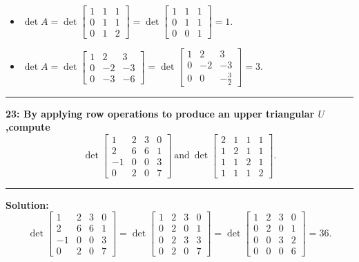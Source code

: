 \documentclass[11pt]{article}
\newcommand\question[2]{\vspace{.25in}\hrule\textbf{#1: #2}\vspace{.5em}\hrule\vspace{.10in}}
\newcommand\solution{\vspace{.10in}\textbf{Solution: }}
\begin{document}
\begin{itemize}
\item $\det A=\det
  \begin{bmatrix}
    1&1&1\\
   0&1&1\\
0&1&2
  \end{bmatrix}=\det
  \begin{bmatrix}
    1&1&1\\
    0&1&1\\
    0&0&1
  \end{bmatrix}=1.
$
\item $\det A=\det
  \begin{bmatrix}
    1&2&3\\
0&-2&-3\\
0&-3&-6
  \end{bmatrix}=\det
  \begin{bmatrix}
    1&2&3\\
    0&-2&-3\\
    0&0&-\frac{3}{2}
  \end{bmatrix}=3.
$
\end{itemize}
\question{23}{By applying row operations to produce an upper
  triangular $U$,compute
$$
\det
\begin{bmatrix}
  1&2&3&0\\
2&6&6&1\\
-1&0&0&3\\
0&2&0&7
\end{bmatrix}~\mbox{and}~\det
\begin{bmatrix}
  2&1&1&1\\
1&2&1&1\\
1&1&2&1\\
1&1&1&2
\end{bmatrix}.
$$
}
\solution 
$$
\det
\begin{bmatrix}
  1&2&3&0\\
  2&6&6&1\\
  -1&0&0&3\\
  0&2&0&7
\end{bmatrix}=\det
\begin{bmatrix}
  1&2&3&0\\
  0&2&0&1\\
  0&2&3&3\\
  0&2&0&7
\end{bmatrix}=\det
\begin{bmatrix}
  1&2&3&0\\
  0&2&0&1\\
  0&0&3&2\\
  0&0&0&6
\end{bmatrix}=36.
$$
\end{document}
